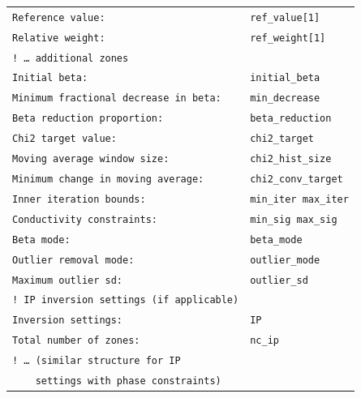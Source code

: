 \documentclass[a4paper,12pt]{article}
\begin{document}
\begin{framed}
\begin{tabular}{@{}p{}@{\hspace{1em}}p{}@{}}
\textcolor{settingcolor}{\texttt{Reference value:}} & \textcolor{valuecolor}{\texttt{ref\_value[1]}} \\
\textcolor{settingcolor}{\texttt{Relative weight:}} & \textcolor{valuecolor}{\texttt{ref\_weight[1]}} \\[0.3em]
\textcolor{commentcolor}{\texttt{! \ldots{} additional zones}} & \\[0.3em]
\textcolor{settingcolor}{\texttt{Initial beta:}} & \textcolor{valuecolor}{\texttt{initial\_beta}} \\
\textcolor{settingcolor}{\texttt{Minimum fractional decrease in beta:}} & \textcolor{valuecolor}{\texttt{min\_decrease}} \\
\textcolor{settingcolor}{\texttt{Beta reduction proportion:}} & \textcolor{valuecolor}{\texttt{beta\_reduction}} \\
\textcolor{settingcolor}{\texttt{Chi2 target value:}} & \textcolor{valuecolor}{\texttt{chi2\_target}} \\
\textcolor{settingcolor}{\texttt{Moving average window size:}} & \textcolor{valuecolor}{\texttt{chi2\_hist\_size}} \\
\textcolor{settingcolor}{\texttt{Minimum change in moving average:}} & \textcolor{valuecolor}{\texttt{chi2\_conv\_target}} \\
\textcolor{settingcolor}{\texttt{Inner iteration bounds:}} & \textcolor{valuecolor}{\texttt{min\_iter max\_iter}} \\
\textcolor{settingcolor}{\texttt{Conductivity constraints:}} & \textcolor{valuecolor}{\texttt{min\_sig max\_sig}} \\
\textcolor{settingcolor}{\texttt{Beta mode:}} & \textcolor{valuecolor}{\texttt{beta\_mode}} \\
\textcolor{settingcolor}{\texttt{Outlier removal mode:}} & \textcolor{valuecolor}{\texttt{outlier\_mode}} \\
\textcolor{settingcolor}{\texttt{Maximum outlier sd:}} & \textcolor{valuecolor}{\texttt{outlier\_sd}} \\[0.3em]
\textcolor{commentcolor}{\texttt{! IP inversion settings (if applicable)}} & \\
\textcolor{settingcolor}{\texttt{Inversion settings:}} & \textcolor{valuecolor}{\texttt{IP}} \\
\textcolor{settingcolor}{\texttt{Total number of zones:}} & \textcolor{valuecolor}{\texttt{nc\_ip}} \\
\textcolor{commentcolor}{\texttt{! \ldots{} (similar structure for IP}} & \\
\textcolor{commentcolor}{\texttt{~~~ settings with phase constraints)}} & \\
\end{tabular}
\end{framed}
\end{document}
